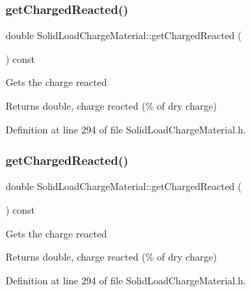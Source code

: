 \subsubsection{\texorpdfstring{get\+Charged\+Reacted()}{getChargedReacted()}\hspace{0.1cm}{\footnotesize\ttfamily [2/3]}}
{\footnotesize\ttfamily double Solid\+Load\+Charge\+Material\+::get\+Charged\+Reacted (\begin{DoxyParamCaption}{ }\end{DoxyParamCaption}) const\hspace{0.3cm}{\ttfamily [inline]}}

Gets the charge reacted \begin{DoxyReturn}{Returns}
double, charge reacted (\% of dry charge) 
\end{DoxyReturn}


Definition at line 294 of file Solid\+Load\+Charge\+Material.\+h.

\mbox{\label{class_solid_load_charge_material_a7c7f05b6ee14eb5f07e5c48c30e9c7a1}} 
\subsubsection{\texorpdfstring{get\+Charged\+Reacted()}{getChargedReacted()}\hspace{0.1cm}{\footnotesize\ttfamily [3/3]}}
{\footnotesize\ttfamily double Solid\+Load\+Charge\+Material\+::get\+Charged\+Reacted (\begin{DoxyParamCaption}{ }\end{DoxyParamCaption}) const\hspace{0.3cm}{\ttfamily [inline]}}

Gets the charge reacted \begin{DoxyReturn}{Returns}
double, charge reacted (\% of dry charge) 
\end{DoxyReturn}


Definition at line 294 of file Solid\+Load\+Charge\+Material.\+h.

\mbox{\label{class_solid_load_charge_material_af6f018c5d67e94d86f2f57fecaa32b5c}} 
